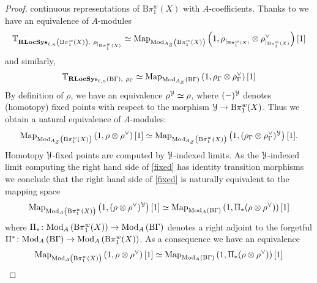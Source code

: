 \documentclass[10pt,a4paper]{amsart}
\numberwithin{equation}{subsection}
\theoremstyle{plain}
\theoremstyle{definition}
\theoremstyle{remark}
\numberwithin{equation}{section}
\begin{document}
\begin{proof}
continuous representations of $\mathrm B \pi_1^w(X)$ with $A$-coefficients. Thanks to \cite[Proposition 4.4.9.]{me1} we have an equivalence of $A$-modules
	\begin{equation} \label{eq:tangSw}
		\mathbb T_{\dLocSys \left( \mathrm B \pi_1^w(X) \right),  \ \rho_{|_{\mathrm B \pi_1^w(X)}}} \simeq \Map_{\Mod_{A_Z} \left(\mathrm B \pi_1^w(X)\right) } \left( 1 ,  \rho_{|_{\mathrm B \pi_1^w(X)} }  \otimes \rho_{|_{\mathrm B \pi_1^w(X)}}^{\vee} \right) [1]
	\end{equation}
and similarly,
	\begin{equation}
		\mathbb T_{\mathbf R \mathbf{LocSys}_{\ell, n} \left( \mathrm B \Gamma \right), \ \rho_{\Gamma}} \simeq \mathrm{Map}_{\mathrm{Mod}_{A_Z} \left(\mathrm B \Gamma \right) } \left( 1 ,  \rho_{\Gamma} \otimes \rho_{\Gamma}^{\vee} \right) [1]
	\end{equation}
By definition of $\rho$, we have an equivalence $\rho^\mathcal Y \simeq \rho$, where $(-)^\mathcal Y$ denotes (homotopy) fixed points with respect to the morphism $\mathcal Y \to \mathrm B \pi_1^w(X)$. Thus we obtain a natural equivalence of $A$-modules:
	\begin{equation} \label{fixed}
		 \mathrm{Map}_{\mathrm{Mod}_{A_Z} \left(\mathrm B \pi_1^w(X)\right) } \left( 1 ,  \rho \otimes \rho^{\vee} \right) [1] \simeq \mathrm{Map}_{\mathrm{Mod}_{A_Z} \left(\mathrm B \pi_1^w(X) \right) } \left( 1 , (  \rho_{\Gamma} \otimes \rho_{\Gamma}^{\vee} )^\mathcal Y \right) [1].
	\end{equation}
Homotopy $\mathcal Y$-fixed points are computed by $\mathcal Y$-indexed limits.
As the $\mathcal Y$-indexed limit computing the right hand side of \eqref{fixed} has identity transition morphisms we conclude that the right hand side of \eqref{fixed} is naturally equivalent to the mapping space
	\begin{equation}
		 \mathrm{Map}_{\mathrm{Mod}_A \left(\mathrm B \pi_1^w(X) \right) } \left( 1 , (  \rho \otimes \rho^{\vee} )^\mathcal Y \right) [1] \simeq \mathrm{Map}_{\mathrm{Mod}_A \left(\mathrm B \Gamma \right) } \left( 1 , \Pi_*(  \rho \otimes \rho^{\vee} ) \right) [1]
	\end{equation}
where $\Pi_* \colon \mathrm{Mod}_A \left(\mathrm B \pi_1^w(X)\right)  \to \mathrm{Mod}_A \left( \mathrm B \Gamma \right) $ denotes a right adjoint to the forgetful $\Pi^* \colon \mathrm{Mod}_A \left( \mathrm B \Gamma \right) \to \mathrm{Mod}_A \left( \mathrm B \pi_1^w(X) \right)$. 
As a consequence we have an equivalence
 	\begin{equation}
		 \Map_{\Mod_A \left(\mathrm B \pi_1^w(X)\right) } \left(1 ,  \rho \otimes \rho^{\vee}  \right) [1] \simeq \Map_{ \Mod_A \left(\mathrm B \Gamma \right) } \left( 1 , \Pi_*(  \rho \otimes \rho^{\vee} ) \right) [1]

\end{equation}
\end{proof}
\end{document}
